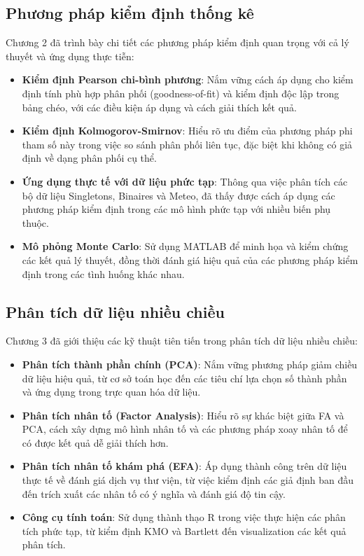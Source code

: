 \subsection*{Phương pháp kiểm định thống kê}

Chương 2 đã trình bày chi tiết các phương pháp kiểm định quan trọng với cả lý thuyết và ứng dụng thực tiễn:

\begin{itemize}
    \item \textbf{Kiểm định Pearson chi-bình phương}: Nắm vững cách áp dụng cho kiểm định tính phù hợp phân phối (goodness-of-fit) và kiểm định độc lập trong bảng chéo, với các điều kiện áp dụng và cách giải thích kết quả.
    
    \item \textbf{Kiểm định Kolmogorov-Smirnov}: Hiểu rõ ưu điểm của phương pháp phi tham số này trong việc so sánh phân phối liên tục, đặc biệt khi không có giả định về dạng phân phối cụ thể.
    
    \item \textbf{Ứng dụng thực tế với dữ liệu phức tạp}: Thông qua việc phân tích các bộ dữ liệu Singletons, Binaires và Meteo, đã thấy được cách áp dụng các phương pháp kiểm định trong các mô hình phức tạp với nhiều biến phụ thuộc.
    
    \item \textbf{Mô phỏng Monte Carlo}: Sử dụng MATLAB để minh họa và kiểm chứng các kết quả lý thuyết, đồng thời đánh giá hiệu quả của các phương pháp kiểm định trong các tình huống khác nhau.
\end{itemize}

\subsection*{Phân tích dữ liệu nhiều chiều}

Chương 3 đã giới thiệu các kỹ thuật tiên tiến trong phân tích dữ liệu nhiều chiều:

\begin{itemize}
    \item \textbf{Phân tích thành phần chính (PCA)}: Nắm vững phương pháp giảm chiều dữ liệu hiệu quả, từ cơ sở toán học đến các tiêu chí lựa chọn số thành phần và ứng dụng trong trực quan hóa dữ liệu.
    
    \item \textbf{Phân tích nhân tố (Factor Analysis)}: Hiểu rõ sự khác biệt giữa FA và PCA, cách xây dựng mô hình nhân tố và các phương pháp xoay nhân tố để có được kết quả dễ giải thích hơn.
    
    \item \textbf{Phân tích nhân tố khám phá (EFA)}: Áp dụng thành công trên dữ liệu thực tế về đánh giá dịch vụ thư viện, từ việc kiểm định các giả định ban đầu đến trích xuất các nhân tố có ý nghĩa và đánh giá độ tin cậy.
    
    \item \textbf{Công cụ tính toán}: Sử dụng thành thạo R trong việc thực hiện các phân tích phức tạp, từ kiểm định KMO và Bartlett đến visualization các kết quả phân tích.
\end{itemize}

